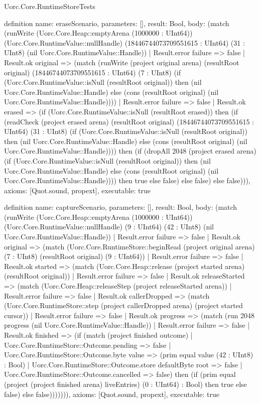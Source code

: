 \begin{lexlean}{Uorc.Core.RuntimeStoreTests}
\begin{semanticmodule}
definition{
  name: eraseScenario,
  parameters: [],
  result: Bool,
  body: (match (runWrite (Uorc.Core.Heap::emptyArena (1000000 : UInt64)) (Uorc.Core.RuntimeValue::nullHandle) (18446744073709551615 : UInt64) (31 : UInt8) (nil Uorc.Core.RuntimeValue::Handle))
    | Result.error failure => false
    | Result.ok original => (match (runWrite (project original arena) (resultRoot original) (18446744073709551615 : UInt64) (7 : UInt8) (if (Uorc.Core.RuntimeValue::isNull (resultRoot original)) then (nil Uorc.Core.RuntimeValue::Handle) else (cons (resultRoot original) (nil Uorc.Core.RuntimeValue::Handle))))
      | Result.error failure => false
      | Result.ok erased => (if (Uorc.Core.RuntimeValue::isNull (resultRoot erased)) then (if (readCheck (project erased arena) (resultRoot original) (18446744073709551615 : UInt64) (31 : UInt8) (if (Uorc.Core.RuntimeValue::isNull (resultRoot original)) then (nil Uorc.Core.RuntimeValue::Handle) else (cons (resultRoot original) (nil Uorc.Core.RuntimeValue::Handle)))) then (if (dropAll 2048 (project erased arena) (if (Uorc.Core.RuntimeValue::isNull (resultRoot original)) then (nil Uorc.Core.RuntimeValue::Handle) else (cons (resultRoot original) (nil Uorc.Core.RuntimeValue::Handle)))) then true else false) else false) else false))),
  axioms: [Quot.sound, propext],
  executable: true
}

definition{
  name: captureScenario,
  parameters: [],
  result: Bool,
  body: (match (runWrite (Uorc.Core.Heap::emptyArena (1000000 : UInt64)) (Uorc.Core.RuntimeValue::nullHandle) (9 : UInt64) (42 : UInt8) (nil Uorc.Core.RuntimeValue::Handle))
    | Result.error failure => false
    | Result.ok original => (match (Uorc.Core.RuntimeStore::beginRead (project original arena) (7 : UInt8) (resultRoot original) (9 : UInt64))
      | Result.error failure => false
      | Result.ok started => (match (Uorc.Core.Heap::release (project started arena) (resultRoot original))
        | Result.error failure => false
        | Result.ok releaseStarted => (match (Uorc.Core.Heap::releaseStep (project releaseStarted arena))
          | Result.error failure => false
          | Result.ok callerDropped => (match (Uorc.Core.RuntimeStore::step (project callerDropped arena) (project started cursor))
            | Result.error failure => false
            | Result.ok progress => (match (run 2048 progress (nil Uorc.Core.RuntimeValue::Handle))
              | Result.error failure => false
              | Result.ok finished => (if (match (project finished outcome)
                | Uorc.Core.RuntimeStore::Outcome.pending => false
                | Uorc.Core.RuntimeStore::Outcome.byte value => (prim equal value (42 : UInt8) : Bool)
                | Uorc.Core.RuntimeStore::Outcome.store defaultByte root => false
                | Uorc.Core.RuntimeStore::Outcome.cancelled => false) then (if (prim equal (project (project finished arena) liveEntries) (0 : UInt64) : Bool) then true else false) else false))))))),
  axioms: [Quot.sound, propext],
  executable: true
}


\end{semanticmodule}
\end{lexlean}
